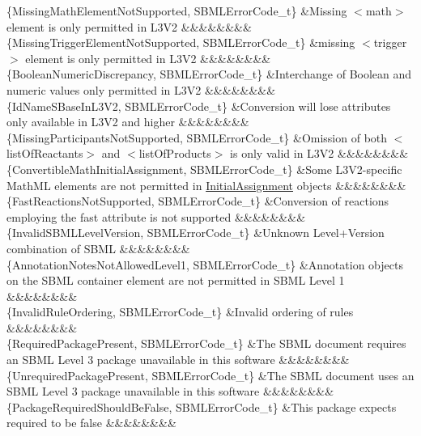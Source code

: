 \begin{DoxyParagraph}{}
\begin{longtabu}
\{Missing\+Math\+Element\+Not\+Supported, S\+B\+M\+L\+Error\+Code\+\_\+t\} &Missing {\ttfamily $<$math$>$} element is only permitted in L3\+V2 &&&&&&&&\\
\{Missing\+Trigger\+Element\+Not\+Supported, S\+B\+M\+L\+Error\+Code\+\_\+t\} &missing {\ttfamily $<$trigger$>$} element is only permitted in L3\+V2 &&&&&&&&\\
\{Boolean\+Numeric\+Discrepancy, S\+B\+M\+L\+Error\+Code\+\_\+t\} &Interchange of Boolean and numeric values only permitted in L3\+V2 &&&&&&&&\\
\{Id\+Name\+S\+Base\+In\+L3\+V2, S\+B\+M\+L\+Error\+Code\+\_\+t\} &Conversion will lose attributes only available in L3\+V2 and higher &&&&&&&&\\
\{Missing\+Participants\+Not\+Supported, S\+B\+M\+L\+Error\+Code\+\_\+t\} &Omission of both {\ttfamily $<$list\+Of\+Reactants$>$} and {\ttfamily $<$list\+Of\+Products$>$} is only valid in L3\+V2 &&&&&&&&\\
\{Convertible\+Math\+Initial\+Assignment, S\+B\+M\+L\+Error\+Code\+\_\+t\} &Some L3\+V2-\/specific Math\+ML elements are not permitted in \hyperlink{class_initial_assignment}{Initial\+Assignment} objects &&&&&&&&\\
\{Fast\+Reactions\+Not\+Supported, S\+B\+M\+L\+Error\+Code\+\_\+t\} &Conversion of reactions employing the \textquotesingle{}fast\textquotesingle{} attribute is not supported &&&&&&&&\\
\{Invalid\+S\+B\+M\+L\+Level\+Version, S\+B\+M\+L\+Error\+Code\+\_\+t\} &Unknown Level+\+Version combination of S\+B\+ML &&&&&&&&\\
\{Annotation\+Notes\+Not\+Allowed\+Level1, S\+B\+M\+L\+Error\+Code\+\_\+t\} &Annotation objects on the S\+B\+ML container element are not permitted in S\+B\+ML Level 1 &&&&&&&&\\
\{Invalid\+Rule\+Ordering, S\+B\+M\+L\+Error\+Code\+\_\+t\} &Invalid ordering of rules &&&&&&&&\\
\{Required\+Package\+Present, S\+B\+M\+L\+Error\+Code\+\_\+t\} &The S\+B\+ML document requires an S\+B\+ML Level 3 package unavailable in this software &&&&&&&&\\
\{Unrequired\+Package\+Present, S\+B\+M\+L\+Error\+Code\+\_\+t\} &The S\+B\+ML document uses an S\+B\+ML Level 3 package unavailable in this software &&&&&&&&\\
\{Package\+Required\+Should\+Be\+False, S\+B\+M\+L\+Error\+Code\+\_\+t\} &This package expects required to be false &&&&&&&&\\

\end{longtabu}
\end{DoxyParagraph}
